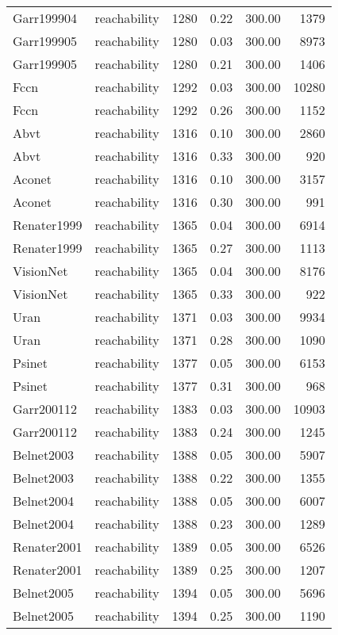 \begin{tabular}{llrrrr}
Garr199904 & reachability & 1280 & 0.22 & 300.00 & 1379 \\
Garr199905 & reachability & 1280 & 0.03 & 300.00 & 8973 \\
Garr199905 & reachability & 1280 & 0.21 & 300.00 & 1406 \\
Fccn & reachability & 1292 & 0.03 & 300.00 & 10280 \\
Fccn & reachability & 1292 & 0.26 & 300.00 & 1152 \\
Abvt & reachability & 1316 & 0.10 & 300.00 & 2860 \\
Abvt & reachability & 1316 & 0.33 & 300.00 & 920 \\
Aconet & reachability & 1316 & 0.10 & 300.00 & 3157 \\
Aconet & reachability & 1316 & 0.30 & 300.00 & 991 \\
Renater1999 & reachability & 1365 & 0.04 & 300.00 & 6914 \\
Renater1999 & reachability & 1365 & 0.27 & 300.00 & 1113 \\
VisionNet & reachability & 1365 & 0.04 & 300.00 & 8176 \\
VisionNet & reachability & 1365 & 0.33 & 300.00 & 922 \\
Uran & reachability & 1371 & 0.03 & 300.00 & 9934 \\
Uran & reachability & 1371 & 0.28 & 300.00 & 1090 \\
Psinet & reachability & 1377 & 0.05 & 300.00 & 6153 \\
Psinet & reachability & 1377 & 0.31 & 300.00 & 968 \\
Garr200112 & reachability & 1383 & 0.03 & 300.00 & 10903 \\
Garr200112 & reachability & 1383 & 0.24 & 300.00 & 1245 \\
Belnet2003 & reachability & 1388 & 0.05 & 300.00 & 5907 \\
Belnet2003 & reachability & 1388 & 0.22 & 300.00 & 1355 \\
Belnet2004 & reachability & 1388 & 0.05 & 300.00 & 6007 \\
Belnet2004 & reachability & 1388 & 0.23 & 300.00 & 1289 \\
Renater2001 & reachability & 1389 & 0.05 & 300.00 & 6526 \\
Renater2001 & reachability & 1389 & 0.25 & 300.00 & 1207 \\
Belnet2005 & reachability & 1394 & 0.05 & 300.00 & 5696 \\
Belnet2005 & reachability & 1394 & 0.25 & 300.00 & 1190 \\

\end{tabular}

